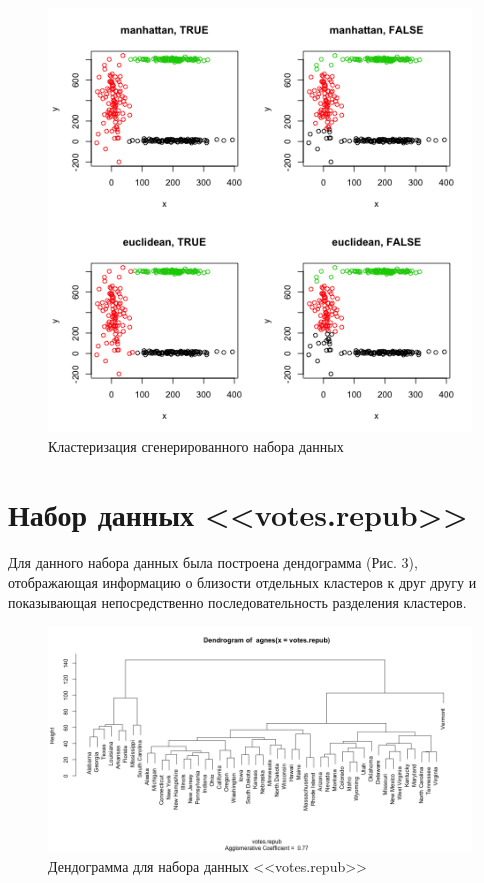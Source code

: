 \documentclass[]{article}
\numberwithin{equation}{section}
\begin{document}
    \begin{figure}[H]
        \centering
        \includegraphics[width = 0.9\linewidth]{data/generated.png}
        \caption{Кластеризация сгенерированного набора данных}
    \end{figure}

    \section{Набор данных <<votes.repub>>}
    Для данного набора данных была построена дендограмма (Рис. 3), отображающая информацию о близости отдельных кластеров к друг другу и показывающая непосредственно последовательность разделения кластеров.

    \begin{figure}[H]
        \centering
        \includegraphics[width = 0.9\linewidth]{data/votes.png}
        \caption{Дендограмма для набора данных <<votes.repub>>}
    \end{figure}
\end{document}
